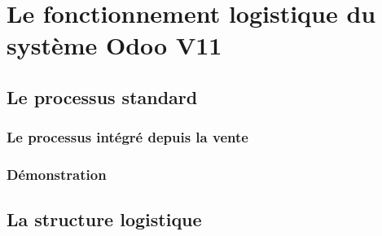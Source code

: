 \documentclass[letterpaper,10pt,french]{sphinxmanual}
\begin{document}
\chapter{Le fonctionnement logistique du système Odoo V11}
\label{\detokenize{readthedocs/fonctionnement:le-fonctionnement-logistique-du-systeme-odoo-v11}}\label{\detokenize{readthedocs/fonctionnement::doc}}

\section{Le processus standard}
\label{\detokenize{readthedocs/fonctionnement:le-processus-standard}}

\subsection{Le processus intégré depuis la vente}
\label{\detokenize{readthedocs/fonctionnement:le-processus-integre-depuis-la-vente}}\begin{quote}

\begin{figure}[htbp]
\centering

\noindent{}
\end{figure}

\end{quote}


\subsection{Démonstration}
\label{\detokenize{readthedocs/fonctionnement:demonstration}}\begin{quote}

\end{quote}


\section{La structure logistique}
\label{\detokenize{readthedocs/fonctionnement:la-structure-logistique}}\begin{quote}

\begin{figure}[htbp]
\centering

\noindent{}
\end{figure}

\end{quote}
\end{document}
